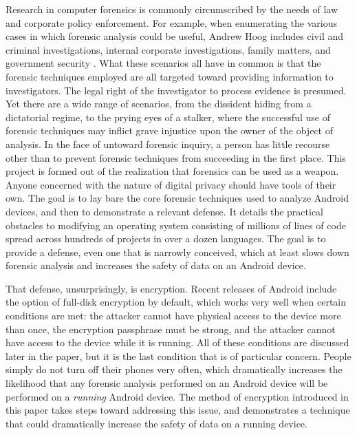 Research in computer forensics is commonly circumscribed by the needs of law and corporate policy enforcement.  For example, when
enumerating the various cases in which forensic analysis could be useful, Andrew Hoog includes civil and criminal investigations,
internal corporate investigations, family matters, and government security \cite{hoog}.  What these scenarios all have in common is
that the forensic techniques employed are all targeted toward providing information to investigators.  The legal right of the
investigator to process evidence is presumed.  Yet there are a wide range of scenarios, from the dissident hiding from a dictatorial
regime, to the prying eyes of a stalker, where the successful use of forensic techniques may inflict grave injustice upon the owner
of the object of analysis.  In the face of untoward forensic inquiry, a person has little recourse other than to prevent forensic
techniques from succeeding in the first place. This project is formed out of the realization that forensics can be used as a weapon.
Anyone concerned with the nature of digital privacy should have tools of their own. The goal is to lay bare the core forensic
techniques used to analyze Android devices, and then to demonstrate a relevant defense. It details the practical obstacles to
modifying an operating system consisting of millions of lines of code spread across hundreds of projects in over a dozen languages.
The goal is to provide a defense, even one that is narrowly conceived, which at least slows down forensic analysis and increases the
safety of data on an Android device. 

That defense, unsurprisingly, is encryption. Recent releases of Android include the option of full-disk encryption by default, which
works very well when certain conditions are met: the attacker cannot have physical access to the device more than once, the
encryption passphrase must be strong, and the attacker cannot have access to the device while it is running. All of these conditions
are discussed later in the paper, but it is the last condition that is of particular concern. People simply do not turn off their
phones very often, which dramatically increases the likelihood that any forensic analysis performed on an Android device will be
performed on a \emph{running} Android device. The method of encryption introduced in this paper takes steps toward addressing this
issue, and demonstrates a technique that could dramatically increase the safety of data on a running device.

